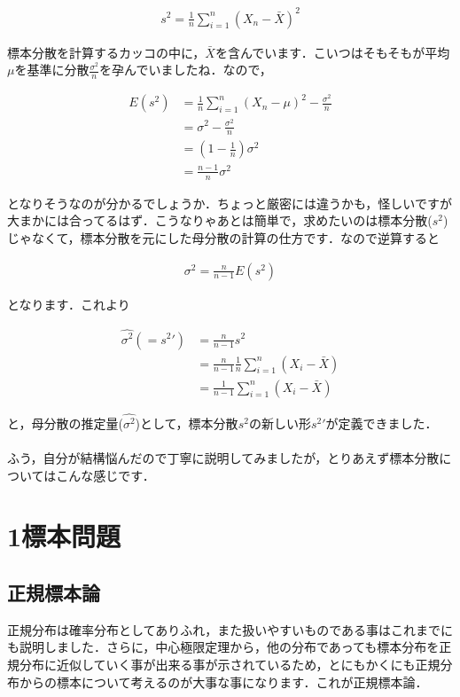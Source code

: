 \documentclass[11pt,a4paper,uplatex]{ujreport} 	%
\begin{document}
\begin{align}
  s^2 = \frac{1}{n} \sum_{i=1}^n(X_n - \bar{X})^2
\end{align}

標本分散を計算するカッコの中に，$\bar{X}$を含んでいます．こいつはそもそもが平均$\mu$を基準に分散$\frac{\sigma^2}{n}$を孕んでいましたね．なので，

\begin{align}
  E(s^2) &= \frac{1}{n} \sum_{i=1}^n(X_n - \mu)^2 - \frac{\sigma^2}{n}\\
      &= \sigma^2 - \frac{\sigma^2}{n}\\
      &= (1-\frac{1}{n})\sigma^2\\
      &= \frac{n-1}{n}\sigma^2
\end{align}

となりそうなのが分かるでしょうか．ちょっと厳密には違うかも，怪しいですが大まかには合ってるはず．こうなりゃあとは簡単で，求めたいのは標本分散($s^2$)じゃなくて，標本分散を元にした母分散の計算の仕方です．なので逆算すると

\begin{align}
  \sigma^2 = \frac{n}{n-1}E(s^2)
\end{align}

となります．これより

\begin{align}
  \hat{\sigma^2}(=s^2\prime) &= \frac{n}{n-1}s^2\\
                 &= \frac{n}{n-1}\frac{1}{n}\sum_{i=1}^n (X_i - \bar{X})\\
                 &= \frac{1}{n-1}\sum_{i=1}^n (X_i - \bar{X})
\end{align}

と，母分散の推定量($\hat{\sigma^2}$)として，標本分散$s^2$の新しい形$s^2\prime$が定義できました．\\
\\

ふう，自分が結構悩んだので丁寧に説明してみましたが，とりあえず標本分散についてはこんな感じです．

\section{1標本問題}

\subsection{正規標本論}
正規分布は確率分布としてありふれ，また扱いやすいものである事はこれまでにも説明しました．さらに，中心極限定理から，他の分布であっても標本分布を正規分布に近似していく事が出来る事が示されているため，とにもかくにも正規分布からの標本について考えるのが大事な事になります．これが正規標本論．\\
\end{document}
